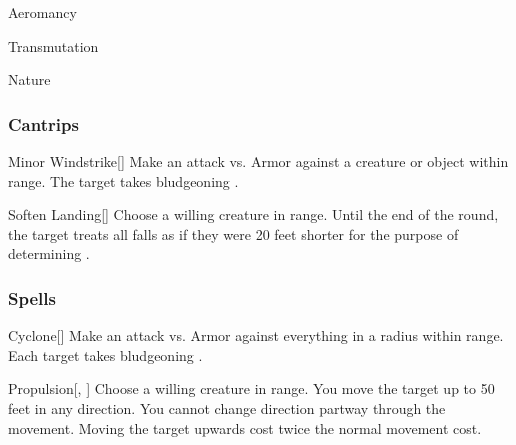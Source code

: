 
\begin{spellsection}{Aeromancy}

\begin{spellheader}
\end{spellheader}


 Transmutation

 Nature

\subsubsection{Cantrips}


\begin{freeability}{Minor Windstrike}[]
Make an attack vs. Armor against a creature or object within \rngmed range.
\hit The target takes bludgeoning .
\end{freeability}


\begin{freeability}{Soften Landing}[]
Choose a willing creature in \rngclose range.
Until the end of the round, the target treats all falls as if they were 20 feet shorter for the purpose of determining .
\end{freeability}

\end{spellsection}


\subsubsection{Spells}


\lowercase{\hypertarget{spell:Cyclone}{}}\label{spell:Cyclone}
\begin{apability}[\nth{1}]{\hypertarget{spell:Cyclone}{Cyclone}}[]
Make an attack vs. Armor against everything in a \areasmall radius within \rngmed range.
\hit Each target takes bludgeoning .
\end{apability}
\vspace{0.25em}



\lowercase{\hypertarget{spell:Propulsion}{}}\label{spell:Propulsion}
\begin{apability}[\nth{1}]{\hypertarget{spell:Propulsion}{Propulsion}}[, ]
Choose a willing creature in \rngclose range.
You move the target up to 50 feet in any direction.
You cannot change direction partway through the movement.
Moving the target upwards cost twice the normal movement cost.
\end{apability}
\vspace{0.25em}



